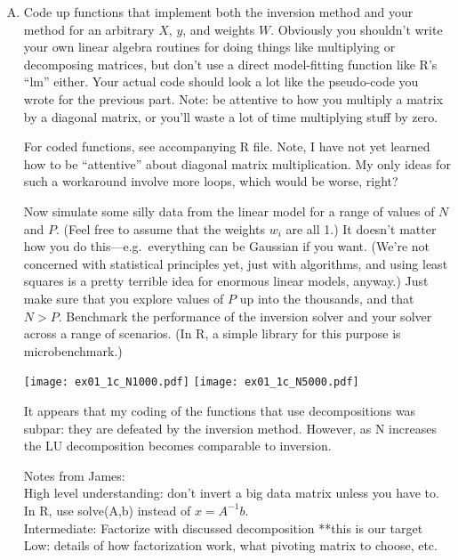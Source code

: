 \documentclass{article}
\begin{document}
\begin{enumerate}[(A)]
\item Code up functions that implement both the inversion method and your method for an arbitrary $X$, $y$, and weights $W$.  Obviously you shouldn't write your own linear algebra routines for doing things like multiplying or decomposing matrices, but don't use a direct model-fitting function like R's ``lm'' either.   Your actual code should look a lot like the pseudo-code you wrote for the previous part.  Note: be attentive to how you multiply a matrix by a diagonal matrix, or you'll waste a lot of time multiplying stuff by zero.

\color{blue}
For coded functions, see accompanying R file. Note, I have not yet learned how to be ``attentive'' about diagonal matrix multiplication. My only ideas for such a workaround involve more loops, which would be worse, right? 
\color{black}


Now simulate some silly data from the linear model for a range of values of $N$ and $P$.  (Feel free to assume that the weights $w_i$ are all 1.)  It doesn't matter how you do this---e.g.~everything can be Gaussian if you want.  (We're not concerned with statistical principles yet, just with algorithms, and using least squares is a pretty terrible idea for enormous linear models, anyway.)  Just make sure that you explore values of $P$ up into the thousands, and that $N > P$.  Benchmark the performance of the inversion solver and your solver across a range of scenarios.  (In R, a simple library for this purpose is microbenchmark.)

\begin{center}
\texttt{[image: ex01\_1c\_N1000.pdf]}
\texttt{[image: ex01\_1c\_N5000.pdf]}
\end{center}

\color{blue}
It appears that my coding of the functions that use decompositions was subpar: they are defeated by the inversion method. However, as N increases the LU decomposition becomes comparable to inversion. 

Notes from James: \\
High level understanding: don't invert a big data matrix unless you have to. In R, use solve(A,b) instead of $x = A^{-1}b$.  \\
Intermediate: Factorize with discussed decomposition **this is our target\\
Low: details of how factorization work, what pivoting matrix to choose, etc. \\
\color{black}


\end{enumerate}
\end{document}
